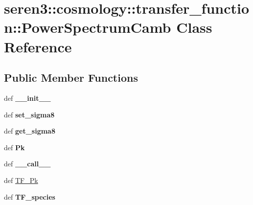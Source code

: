 \hypertarget{classseren3_1_1cosmology_1_1transfer__function_1_1PowerSpectrumCamb}{
\section{seren3::cosmology::transfer\_\-function::PowerSpectrumCamb Class Reference}
\label{classseren3_1_1cosmology_1_1transfer__function_1_1PowerSpectrumCamb}
}
\subsection*{Public Member Functions}
\begin{DoxyCompactItemize}
\item 
\hypertarget{classseren3_1_1cosmology_1_1transfer__function_1_1PowerSpectrumCamb_a115a61fcff7f33c590ec9ca0fba2309b}{
def {\bfseries \_\-\_\-init\_\-\_\-}}
\label{classseren3_1_1cosmology_1_1transfer__function_1_1PowerSpectrumCamb_a115a61fcff7f33c590ec9ca0fba2309b}

\item 
\hypertarget{classseren3_1_1cosmology_1_1transfer__function_1_1PowerSpectrumCamb_adc328831bb1d3d96889d5c314e43051c}{
def {\bfseries set\_\-sigma8}}
\label{classseren3_1_1cosmology_1_1transfer__function_1_1PowerSpectrumCamb_adc328831bb1d3d96889d5c314e43051c}

\item 
\hypertarget{classseren3_1_1cosmology_1_1transfer__function_1_1PowerSpectrumCamb_a6f7ddd6930a5c770ac6d8c54bc4647ef}{
def {\bfseries get\_\-sigma8}}
\label{classseren3_1_1cosmology_1_1transfer__function_1_1PowerSpectrumCamb_a6f7ddd6930a5c770ac6d8c54bc4647ef}

\item 
\hypertarget{classseren3_1_1cosmology_1_1transfer__function_1_1PowerSpectrumCamb_a75ec679c2105b0d8810eb9fb8558e7e4}{
def {\bfseries Pk}}
\label{classseren3_1_1cosmology_1_1transfer__function_1_1PowerSpectrumCamb_a75ec679c2105b0d8810eb9fb8558e7e4}

\item 
\hypertarget{classseren3_1_1cosmology_1_1transfer__function_1_1PowerSpectrumCamb_ae84fd3927ed9381f68d2a8737b919632}{
def {\bfseries \_\-\_\-call\_\-\_\-}}
\label{classseren3_1_1cosmology_1_1transfer__function_1_1PowerSpectrumCamb_ae84fd3927ed9381f68d2a8737b919632}

\item 
def \hyperlink{classseren3_1_1cosmology_1_1transfer__function_1_1PowerSpectrumCamb_a743a49a9b9d6e14d226973967cc8e3c7}{TF\_\-Pk}
\item 
\hypertarget{classseren3_1_1cosmology_1_1transfer__function_1_1PowerSpectrumCamb_a3678e7b18343a71eb08d3aee77e13e60}{
def {\bfseries TF\_\-species}}
\label{classseren3_1_1cosmology_1_1transfer__function_1_1PowerSpectrumCamb_a3678e7b18343a71eb08d3aee77e13e60}

\end{DoxyCompactItemize}
